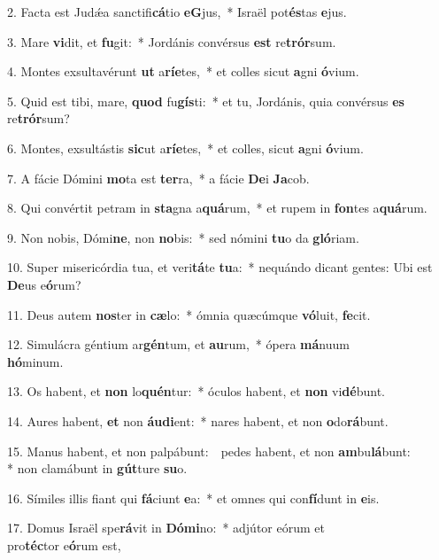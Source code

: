 2. Facta est Jud\'{\ae}a sanctifi\textbf{cá}tio \textbf{eG}jus,~* 
	Israël pot\textbf{és}tas \textbf{e}jus.

3. Mare \textbf{vi}dit, et \textbf{fu}git:~* 
	Jordánis convérsus \textbf{est} re\textbf{trór}sum.

4. Montes exsultavérunt \textbf{ut} a\textbf{rí}\textbf{e}tes,~* 
	et colles sicut \textbf{a}gni \textbf{ó}vium.

5. Quid est tibi, mare, \textbf{quod} fu\textbf{gís}ti:~* 
	et tu, Jordánis, quia convérsus \textbf{es} re\textbf{trór}sum?

6. Montes, exsultástis \textbf{sic}ut a\textbf{rí}\textbf{e}tes,~* 
	et colles, sicut \textbf{a}gni \textbf{ó}vium.

7. A fácie Dómini \textbf{mo}ta est \textbf{ter}ra,~* 
	a fácie \textbf{De}i \textbf{Ja}cob.

8. Qui convértit petram in \textbf{sta}gna a\textbf{quá}rum,~* 
	et rupem in \textbf{fon}tes a\textbf{quá}rum.

9. Non nobis, Dómi\textbf{ne}, non \textbf{no}bis:~* 
	sed nómini \textbf{tu}o da \textbf{gló}riam.

10. Super misericórdia tua, et veri\textbf{tá}te \textbf{tu}a:~* 
	nequándo dicant gentes: Ubi est \textbf{De}us e\textbf{ó}rum?

11. Deus autem \textbf{nos}ter in \textbf{cæ}lo:~* 
	ómnia quæcúmque \textbf{vó}luit, \textbf{fe}cit.

12. Simulácra géntium ar\textbf{gén}tum, et \textbf{au}rum,~* 
	ópera \textbf{má}nuum\\ \textbf{hó}minum.

13. Os habent, et \textbf{non} lo\textbf{quén}tur:~* 
	óculos habent, et \textbf{non} vi\textbf{dé}bunt.

14. Aures habent, \textbf{et} non \textbf{áu}\textbf{di}ent:~* 
	nares habent, et non \textbf{o}do\textbf{rá}bunt.

15. Manus habent, et non palpábunt:~{\color{red}\GreDagger}\ pedes habent, et non \textbf{am}bu\textbf{lá}bunt:\\ * 
	non clamábunt in \textbf{gút}ture \textbf{su}o.

16. Símiles illis fiant qui \textbf{fá}ciunt \textbf{e}a:~* 
	et omnes qui con\textbf{fí}dunt in \textbf{e}is.

17. Domus Israël spe\textbf{rá}vit in \textbf{Dó}\textbf{mi}no:~* 
	adjútor eórum et\\ pro\textbf{téc}tor e\textbf{ó}rum est,

